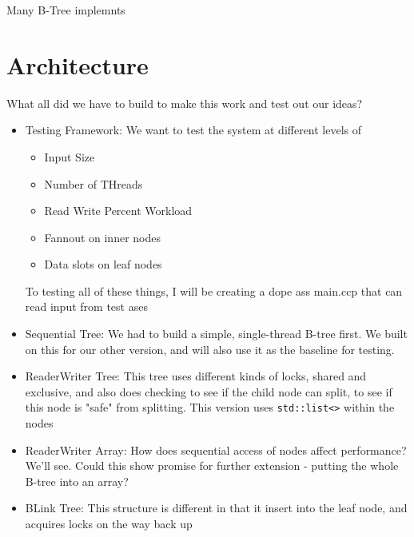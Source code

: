 \documentclass{sig-alternate}
\begin{document}
Many B-Tree implemnts

\section{Architecture}
What all did we have to build to make this work and test out our ideas?
\begin{itemize}
  \item{Testing Framework:} We want to test the system at different levels of
    \begin{itemize}
      \item Input Size
      \item Number of THreads
      \item Read Write Percent Workload
      \item Fannout on inner nodes
      \item Data slots on leaf nodes
    \end{itemize}
    To testing all of these things, I will be creating a dope ass main.ccp that can read input from test ases
  \item{Sequential Tree:} We had to build a simple, single-thread B-tree first.  We built on this for our other version, and will also use it as the baseline for testing.
  \item{ReaderWriter Tree:} This tree uses different kinds of locks, shared and exclusive, and also does checking to see if the child node can split, to see if this node is "safe" from splitting.  This version uses \texttt{std::list<>} within the nodes
  \item{ReaderWriter Array:} How does sequential access of nodes affect performance?  We'll see.  Could this show promise for further extension - putting the whole B-tree into an array?
  \item{BLink Tree:} This structure is different in that it insert into the leaf node, and acquires locks on the way back up
\end{itemize}
\end{document}
